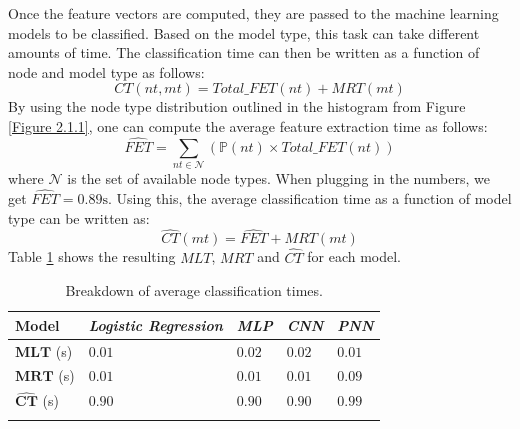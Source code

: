 			Once the feature vectors are computed, they are passed to the machine learning models to be classified. Based on the model type, this task can take different amounts of time. The classification time can then be written as a function of node and model type as follows: 
			\begin{equation}
				CT(nt, mt) = Total\_FET(nt) + MRT(mt)
			\end{equation}
			By using the node type distribution outlined in the histogram from Figure \ref{Figure 2.1.1}, one can compute the average feature extraction time as follows:
			\begin{equation}
				\hat{FET} = \sum_{nt\in \mathbf{\mathcal{N}}} (\mathbb{P}(nt) \times Total\_FET(nt))
			\end{equation} 
			where $\mathcal{N}$ is the set of available node types. When plugging in the numbers, we get $\hat{FET} = 0.89\text{s}$. Using this, the average classification time as a function of model type can be written as: 
			\begin{equation}
				\hat{CT}(mt) =  \hat{FET} + MRT(mt) 
			\end{equation}  
			 Table \ref{Table: eval/service-time/classification/CT} shows the resulting $MLT$, $MRT$  and $\hat{CT}$ for each model.
			
			\begin{longtable}{|p{.15\textwidth}||p{}|p{}|p{}|p{}|}
				\textbf{Model} & \textit{Logistic Regression} & \textit{MLP} & \textit{CNN} & \textit{PNN} \\
				\hline
				$\mathbf{MLT}$ (s) & $0.01$ & $0.02$ & $0.02$ & $0.01$  \\
				\hline
				$\mathbf{MRT}$ (s) & $0.01$ &$0.01$ & $0.01$ & $0.09$ \\
				\hline\hline
				$\mathbf{\hat{CT}}$ (s) & $\mathbf{0.90}$ & $\mathbf{0.90}$ & $\mathbf{0.90}$ & $\mathbf{0.99}$ \\
				\hline
				\caption{Breakdown of average classification times.}
				\label{Table: eval/service-time/classification/CT}
			\end{longtable} 
			
